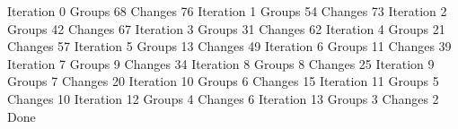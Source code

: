 \documentclass[letterpaper,10pt,english]{sphinxmanual}
\begin{document}
\begin{sphinxVerbatim}[commandchars=\\\{\}]
      \PYG{p}{[}\PYG{p}{]}
       
         
               \PYG{p}{[}  \PYG{p}{]}
                 
          
\end{sphinxVerbatim}

\begin{sphinxVerbatim}[commandchars=\\\{\}]
Iteration 0 Groups 68 Changes 76
Iteration 1 Groups 54 Changes 73
Iteration 2 Groups 42 Changes 67
Iteration 3 Groups 31 Changes 62
Iteration 4 Groups 21 Changes 57
Iteration 5 Groups 13 Changes 49
Iteration 6 Groups 11 Changes 39
Iteration 7 Groups 9 Changes 34
Iteration 8 Groups 8 Changes 25
Iteration 9 Groups 7 Changes 20
Iteration 10 Groups 6 Changes 15
Iteration 11 Groups 5 Changes 10
Iteration 12 Groups 4 Changes 6
Iteration 13 Groups 3 Changes 2
Done
\end{sphinxVerbatim}
\end{document}
